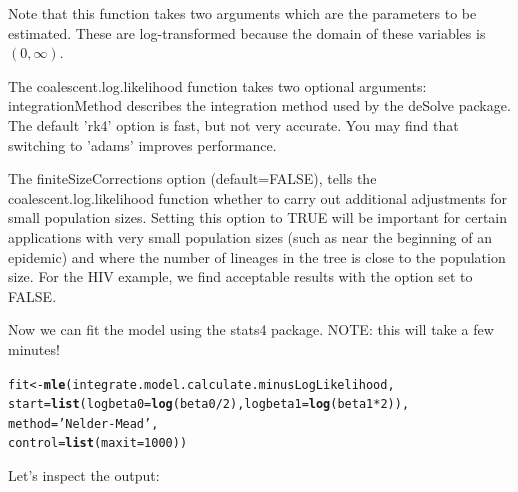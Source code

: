 \documentclass[english]{article}\usepackage[]{graphicx}\usepackage[]{color}
\makeatletter
\newcommand{\hlnum}[1]{\textcolor[rgb]{0.686,0.059,0.569}{#1}}%
\newcommand{\hlstr}[1]{\textcolor[rgb]{0.192,0.494,0.8}{#1}}%
\newcommand{\hlopt}[1]{\textcolor[rgb]{0,0,0}{#1}}%
\newcommand{\hlstd}[1]{\textcolor[rgb]{0.345,0.345,0.345}{#1}}%
\newcommand{\hlkwb}[1]{\textcolor[rgb]{0.69,0.353,0.396}{#1}}%
\newcommand{\hlkwc}[1]{\textcolor[rgb]{0.333,0.667,0.333}{#1}}%
\newcommand{\hlkwd}[1]{\textcolor[rgb]{0.737,0.353,0.396}{\textbf{#1}}}%
\newenvironment{kframe}{%
 \def\at@end@of@kframe{}%
 \ifinner\ifhmode%
  \def\at@end@of@kframe{\end{minipage}}%
  \begin{minipage}{\columnwidth}%
 \fi\fi%
 \def\FrameCommand##1{\hskip\@totalleftmargin \hskip-\fboxsep
 \colorbox{shadecolor}{##1}\hskip-\fboxsep
     \hskip-\linewidth \hskip-\@totalleftmargin \hskip\columnwidth}%
 \MakeFramed {\advance\hsize-\width
   \@totalleftmargin\z@ \linewidth\hsize
   \@setminipage}}%
 {\par\unskip\endMakeFramed%
 \at@end@of@kframe}
\newenvironment{knitrout}{}{} %
\makeatother
\begin{document}
Note that this function takes two arguments which are the parameters
to be estimated. These are log-transformed because the domain of these
variables is $(0,\infty)$. 

The coalescent.log.likelihood function takes two optional arguments:
integrationMethod describes the integration method used by the deSolve
package. The default 'rk4' option is fast, but not very accurate.
You may find that switching to 'adams' improves performance. 

The finiteSizeCorrections option (default=FALSE), tells the coalescent.log.likelihood
function whether to carry out additional adjustments for small population
sizes. Setting this option to TRUE will be important for certain applications
with very small population sizes (such as near the beginning of an
epidemic) and where the number of lineages in the tree is close to
the population size. For the HIV example, we find acceptable results
with the option set to FALSE. 

Now we can fit the model using the stats4 package. NOTE: this will
take a few minutes! 

\begin{knitrout}
\color{fgcolor}\begin{kframe}
\begin{alltt}
\hlstd{fit} \hlkwb{<-} \hlkwd{mle}\hlstd{(integrate.model.calculate.minusLogLikelihood,}
           \hlkwc{start} \hlstd{=} \hlkwd{list}\hlstd{(} \hlkwc{logbeta0}\hlstd{=}\hlkwd{log}\hlstd{(beta0}\hlopt{/}\hlnum{2}\hlstd{),}\hlkwc{logbeta1}\hlstd{=}\hlkwd{log}\hlstd{(beta1}\hlopt{*}\hlnum{2}\hlstd{)),}
           \hlkwc{method}\hlstd{=}\hlstr{'Nelder-Mead'}\hlstd{,}
           \hlkwc{control}\hlstd{=}\hlkwd{list}\hlstd{(}\hlkwc{maxit}\hlstd{=}\hlnum{1000} \hlstd{) )}
\end{alltt}
\end{kframe}
\end{knitrout}


Let's inspect the output: 
\end{document}
